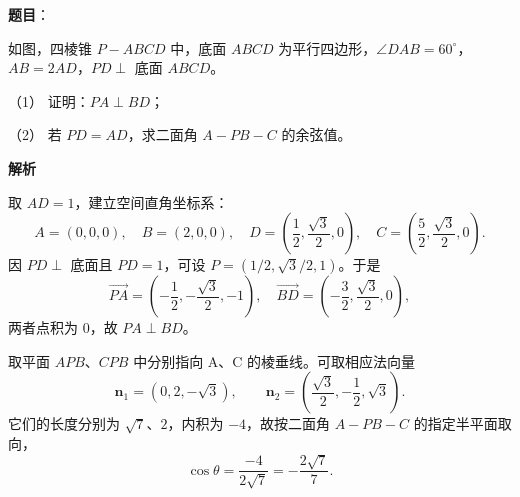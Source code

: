 \begin{answer}

\textbf{题目}：

如图，四棱锥 $P-ABCD$ 中，底面 $ABCD$ 为平行四边形，$\angle DAB=60^\circ$，$AB=2AD$，$PD\perp$ 底面 $ABCD$。
\nopagebreak[4]
\begin{center}\end{center}
\nopagebreak[4]
（1） 证明：$PA\perp BD$；

（2） 若 $PD=AD$，求二面角 $A-PB-C$ 的余弦值。

\textbf{解析}


取 $AD=1$，建立空间直角坐标系：
\nopagebreak[4]
\[
A=(0,0,0),\quad B=(2,0,0),\quad
D=\left(\frac12,\frac{\sqrt3}{2},0\right),\quad
C=\left(\frac52,\frac{\sqrt3}{2},0\right).
\]
因 $PD\perp$ 底面且 $PD=1$，可设 $P=(1/2,\sqrt3/2,1)$。于是
\nopagebreak[4]
\[
\overrightarrow{PA}=\left(-\frac12,-\frac{\sqrt3}{2},-1\right),\quad
\overrightarrow{BD}=\left(-\frac32,\frac{\sqrt3}{2},0\right),
\]
两者点积为 $0$，故 $PA\perp BD$。


取平面 $APB$、$CPB$ 中分别指向 A、C 的棱垂线。可取相应法向量
\nopagebreak[4]
\[
\boldsymbol n_1=(0,2,-\sqrt3),\qquad
\boldsymbol n_2=\left(\frac{\sqrt3}{2},-\frac12,\sqrt3\right).
\]
它们的长度分别为 $\sqrt7$、$2$，内积为 $-4$，故按二面角 $A-PB-C$ 的指定半平面取向，
\nopagebreak[4]
\[
\cos\theta=\frac{-4}{2\sqrt7}=-\frac{2\sqrt7}{7}.
\]



\end{answer}
